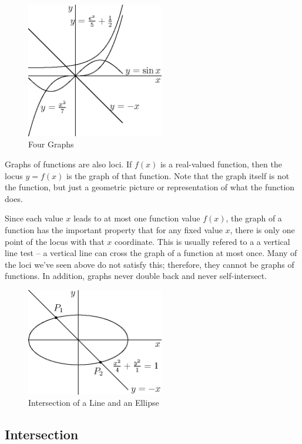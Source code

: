 \documentclass[fleqn]{report}
\begin{document}
\begin{figure}[t]
\centering
\includegraphics[width=6cm]{figure08.eps}
\caption{Four Graphs}
\label{figure-four-graphs} 
\end{figure}

Graphs of functions are also loci. If $f(x)$ is a real-valued
function, then the locus $y = f(x)$ is the graph of that
function. Note that the graph itself is not the function, but
just a geometric picture or representation of what the
function does. 

Since each value $x$ leads to at most one function value $f(x)$,
the graph of a function has the important property that for any
fixed value $x$, there is only one point of the locus with that
$x$ coordinate. This is usually refered to a a vertical line
test -- a vertical line can cross the graph of a function at
most once. Many of the loci we've seen above do not satisfy
this; therefore, they cannot be graphs of functions. In
addition, graphs never double back and never self-intersect. 

\begin{figure}[t]
\centering
\includegraphics[width=6cm]{figure24.eps}
\caption{Intersection of a Line and an Ellipse}
\label{figure-intersection}
\end{figure}

\subsection{Intersection}
\label{intersection}
\end{document}
